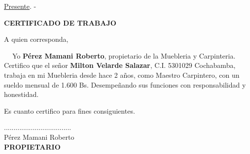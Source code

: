 \documentclass[letterpaper,12pt]{letter}
\begin{document}
\date {13 de agosto de 2011}

\begin{letter}{\underline {Presente}. -}

\begin{center}
	\opening{\textbf{CERTIFICADO DE TRABAJO}}
\end{center}

A quien corresponda,

$\ \ \ \ $ Yo {\bfseries P\'erez Mamani Roberto}, propietario de la Muebleria y Carpinteria. Certifico que el se\~nor 
{\bfseries Milton Velarde Salazar}, C.I. 5301029 Cochabamba, trabaja en mi Muebleria desde hace 2 a\~nos, como Maestro 
Carpintero, con un sueldo mensual de 1.600 Bs. Desempe\~nando sus funciones con responsabilidad y honestidad.

Es cuanto certifico para fines consiguientes.

\vspace{7cm}

\begin{center}
...................................\\
P\'erez Mamani Roberto\\
{\bfseries PROPIETARIO}
\end{center}

\end{letter}
\end{document}
